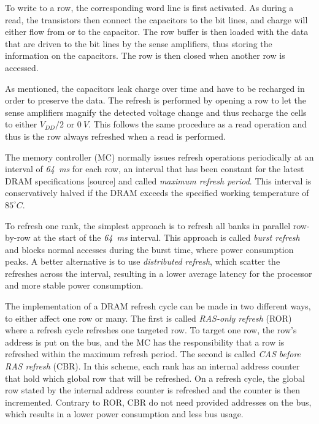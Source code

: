 To write to a row, the corresponding word line is first activated. As during a read, the transistors then connect the capacitors to the bit lines, and charge will either flow from or to the capacitor. The row buffer is then loaded with the data that are driven to the bit lines by the sense amplifiers, thus storing the information on the capacitors. The row is then closed when another row is accessed.

As mentioned, the capacitors leak charge over time and have to be recharged in order to preserve the data. The refresh is performed by opening a row to let the sense amplifiers magnify the detected voltage change and thus recharge the cells to either $V_{DD}/2$ or $0\:V$. This follows the same procedure as a read operation and thus is the row always refreshed when a read is performed. %

The memory controller (MC) normally issues refresh operations periodically at an interval of \textit{64~ms} for each row, an interval that has been constant for the latest DRAM specifications [source] and called \textit{maximum refresh period}. This interval is conservatively halved if the DRAM exceeds the specified working temperature of $85^{\circ}C$. 

To refresh one rank, the simplest approach is to refresh all banks in parallel row-by-row at the start of the \textit{64~ms} interval. This approach is called \textit{burst refresh} and blocks normal accesses during the burst time, where power consumption peaks. A better alternative is to use \textit{distributed refresh}, which scatter the refreshes across the interval, resulting in a lower average latency for the processor and more stable power consumption.

The implementation of a DRAM refresh cycle can be made in two different ways, to either affect one row or many. The first is called \textit{RAS-only refresh} (ROR) where a refresh cycle refreshes one targeted row. To target one row, the row's address is put on the bus, and the MC has the responsibility that a row is refreshed within the maximum refresh period. The second is called \textit{CAS before RAS refresh} (CBR). In this scheme, each rank has an internal address counter that hold which global row that will be refreshed. On a refresh cycle, the global row stated by the internal address counter is refreshed and the counter is then incremented. Contrary to ROR, CBR do not need provided addresses on the bus, which results in a lower power consumption and less bus usage. %


